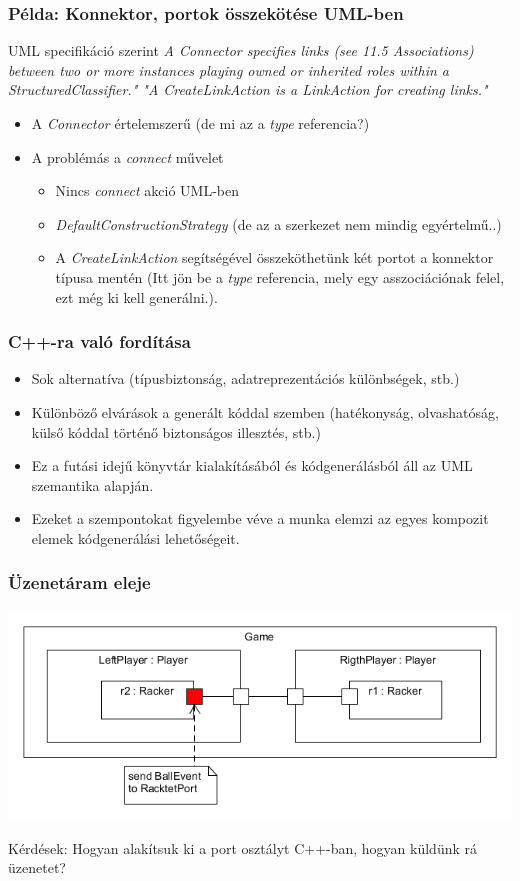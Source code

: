 \documentclass[11pt]{beamer}
\begin{document}
\begin{frame}

	\frametitle{Példa: Konnektor, portok összekötése UML-ben}
	\begin{block}{UML specifikáció szerint}
	\textit{A Connector specifies links (see 11.5 Associations) between two or more instances playing owned or inherited roles within a StructuredClassifier." "A CreateLinkAction is a LinkAction for creating links."}
	\end{block}
	\begin{itemize}
	\item A \textit{Connector} értelemszerű (de mi az a \textit{type} referencia?)
	\item A problémás a \textit{connect} művelet
		\begin{itemize}
		\item Nincs \textit{connect} akció UML-ben
		\item \textit{DefaultConstructionStrategy}  (de az a szerkezet nem mindig egyértelmű..)
		\item A \textit{CreateLinkAction} segítségével összeköthetünk két portot a konnektor típusa mentén (Itt jön be a \textit{type} referencia, mely egy asszociációnak felel, ezt még ki kell generálni.).
		\end{itemize}
	\end{itemize}
\end{frame}


\begin{frame}[fragile]	
	\frametitle{C++-ra való fordítása}	
	\begin{itemize}
	\item Sok alternatíva (típusbiztonság, adatreprezentációs különbségek, stb.)
	\item Különböző elvárások a generált kóddal szemben (hatékonyság, olvashatóság, külső kóddal történő biztonságos illesztés, stb.)
	\item Ez a futási idejű könyvtár kialakításából és kódgenerálásból áll  az UML szemantika alapján.
	\item Ezeket a szempontokat figyelembe véve a munka elemzi az egyes kompozit elemek  kódgenerálási lehetőségeit.
	\end{itemize}
	
\end{frame}

\begin{frame}
	\frametitle{Üzenetáram eleje}
	\includegraphics[scale=0.5]{vedes_demo_send.png}
	
	Kérdések: Hogyan alakítsuk ki a port osztályt C++-ban, hogyan küldünk rá üzenetet?
	
\end{frame}
\end{document}

